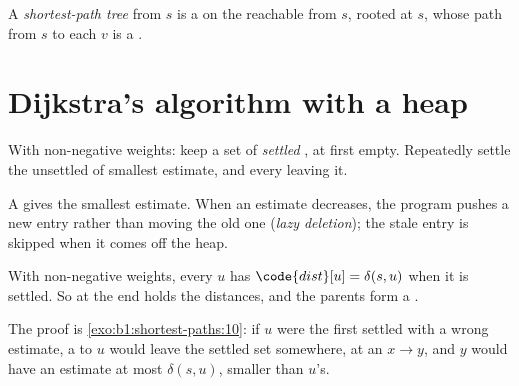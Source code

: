 \begin{definition}\label{def:b1:shortest-paths:tree}
A \emph{shortest-path tree} from $s$ is a  on the  reachable from $s$,
rooted at $s$, whose path from $s$ to each  $v$ is a .
\end{definition}

\section{Dijkstra's algorithm with a heap}\label{sec:b1:shortest-paths:dijkstra}

\begin{method}\label{met:b1:shortest-paths:dijkstra}
With non-negative weights: keep a set of \emph{settled} , at first empty. Repeatedly settle the unsettled 
of smallest estimate, and  every  leaving it.
\end{method}

A  gives the smallest estimate. When an estimate decreases, the program pushes a new entry rather than
moving the old one (\emph{lazy deletion}); the stale entry is skipped when it comes off the heap.

\label{lst:b1:shortest-paths:dijkstra}

\begin{theorem}\label{thm:b1:shortest-paths:dijkstra}
With non-negative weights, every  $u$ has $\code{dist}[u] = \delta(s, u)$ when it is settled. So at the end
 holds the distances, and the parents form a .
\end{theorem}

The proof is \cref{exo:b1:shortest-paths:10}: if $u$ were the first  settled with a wrong estimate, a  to $u$ would leave the settled set somewhere, at an  $x \to y$, and $y$ would have an estimate at most
$\delta(s, u)$, smaller than $u$'s.

